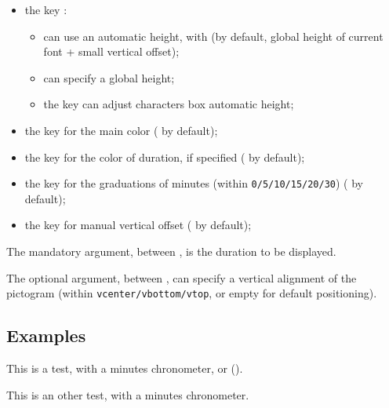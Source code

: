 \documentclass[english,11pt,a4paper]{article}
\begin{document}
\begin{itemize}
	\item the key :
	\begin{itemize}
		\item can use an automatic height, with  (by default, global height of current font {\setlength\fboxsep{0.25pt}} + small vertical offset);
		\item can specify a global height;
		\item the  key can adjust characters box automatic height;
	\end{itemize}
	\item the key  for the main color ( by default);
	\item the key  for the color of duration, if specified ( by default);
	\item the key  for the graduations of minutes (within \texttt{0/5/10/15/20/30}) ( by default);
	\item the key  for manual vertical offset ( by default);
\end{itemize}

\medskip

The mandatory argument, between , is the duration to be displayed.

\medskip

The optional argument, between , can specify a vertical alignment of the pictogram (within \texttt{vcenter/vbottom/vtop}, or empty for default positioning).

\subsection{Examples}

\begin{demohigh}[language=latex/latex2,style/main=cyan!10,style/code=cyan!10]
This is a test, with a  minutes chronometer, or ().
\end{demohigh}

\begin{demohigh}[language=latex/latex2,style/main=cyan!10,style/code=cyan!10]
{\Huge This is an other test, with a 
 minutes chronometer.}
\end{demohigh}
\end{document}
